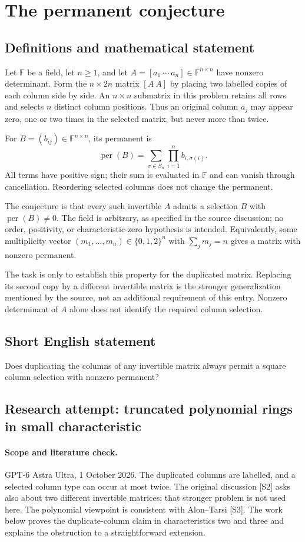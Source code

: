 \documentclass[11pt,a4paper]{article}
\begin{document}
\section*{The permanent conjecture}\label{statement}

\subsection{Definitions and mathematical statement}
Let $\mathbb F$ be a field, let $n\ge1$, and let
$A=[a_1\ \cdots\ a_n]\in\mathbb F^{n\times n}$ have nonzero determinant.
Form the $n\times2n$ matrix $[A\ A]$ by placing two labelled copies of
each column side by side. An $n\times n$ submatrix in this problem retains
all rows and selects $n$ distinct column positions. Thus an original
column $a_j$ may appear zero, one or two times in the selected matrix,
but never more than twice.

For $B=(b_{ij})\in\mathbb F^{n\times n}$, its permanent is
\[
 \operatorname{per}(B)=\sum_{\sigma\in S_n}
                         \prod_{i=1}^n b_{i,\sigma(i)}.
\]
All terms have positive sign; their sum is evaluated in $\mathbb F$ and
can vanish through cancellation. Reordering selected columns does not
change the permanent.

The conjecture is that every such invertible $A$ admits a selection $B$
with $\operatorname{per}(B)\ne0$. The field is arbitrary, as specified
in the source discussion; no order, positivity, or characteristic-zero
hypothesis is intended. Equivalently, some multiplicity vector
$(m_1,\ldots,m_n)\in\{0,1,2\}^n$ with $\sum_jm_j=n$ gives a matrix
with nonzero permanent.

The task is only to establish this property for the duplicated matrix.
Replacing its second copy by a different invertible matrix is the
stronger generalization mentioned by the source, not an additional
requirement of this entry. Nonzero determinant of $A$ alone does not
identify the required column selection.
\subsection{Short English statement}
Does duplicating the columns of any invertible matrix always permit a square column selection with nonzero permanent?
\subsection{Research attempt: truncated polynomial rings in small characteristic}
\paragraph{Scope and literature check.}
GPT-6 Astra Ultra, 1 October 2026. The duplicated columns are labelled,
and a selected column type can occur at most twice. The original
discussion [S2] asks also about two different invertible matrices; that
stronger problem is not used here. The polynomial viewpoint is consistent
with Alon--Tarsi [S3]. The work below proves the duplicate-column claim
in characteristics two and three and explains the obstruction to a
straightforward extension.
\end{document}
